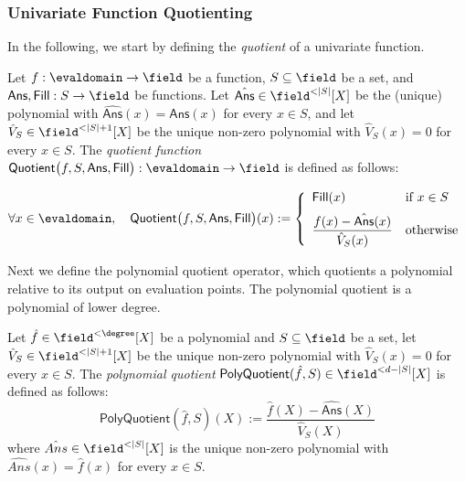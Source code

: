 \subsubsection{Univariate Function Quotienting}\label{sec:quotienting}

In the following, we start by defining the \emph{quotient} of a univariate function.
\begin{definition}\label{def:quotient}
    Let $f:\evaldomain\to\field$ be a function, $S\subseteq\field$ be a set, and $\mathsf{Ans},\mathsf{Fill}: S\rightarrow\field$ be functions. Let $\hat{\mathsf{Ans}}\in\field^{<|S|}[X]$ be the (unique) polynomial with $\hat{\mathsf{Ans}}(x)=\mathsf{Ans}(x)$ for every $x\in S$, and let $\hat{V}_S\in\field^{<|S|+1}[X]$ be the unique non-zero polynomial with $\hat{V}_S(x)=0$ for every $x\in S$.
    The \emph{quotient function} $\mathsf{Quotient}\bigl(f,S,\mathsf{Ans},\mathsf{Fill}\bigr): \evaldomain\to\field$
    is defined as follows:

    \[
    \forall x \in \evaldomain, \quad
    \mathsf{Quotient}\bigl(f, S, \mathsf{Ans}, \mathsf{Fill} \bigr)(x)
    :=
    \left\{
    \begin{array}{ll}
        \mathsf{Fill}(x)
        & \text{if } x \in S \\[6pt]
        \dfrac{f(x) - \hat{\mathsf{Ans}}(x)}{\hat{V}_S(x)}
        & \text{otherwise}
    \end{array}
    \right.
    \]

\end{definition}

Next we define the polynomial quotient operator, which quotients a polynomial relative to its output on evaluation points. The polynomial quotient is a polynomial of lower degree.

\begin{definition}\label{def:poly_quotient}
    Let $\hat{f}\in\field^{<\degree}[X]$ be a polynomial and $S\subseteq\field$ be a set, let $\hat{V}_S\in\field^{<|S|+1}[X]$ be the unique non-zero polynomial with $\hat{V}_S(x)=0$ for every $x\in S$. The \emph{polynomial quotient} $\mathsf{PolyQuotient}(\hat{f},S)\in\field^{<d-|S|}[X]$ is defined as follows:
    \[
            \mathsf{PolyQuotient}(\hat{f},S)(X):=\frac{\hat{f}(X)-\hat{\mathsf{Ans}}(X)}{\hat{V}_S(X)}
    \]
where $\hat{Ans}\in\field^{<|S|}[X]$ is the unique non-zero polynomial with $\hat{Ans}(x)=\hat{f}(x)$ for every $x \in S$.
\end{definition}

